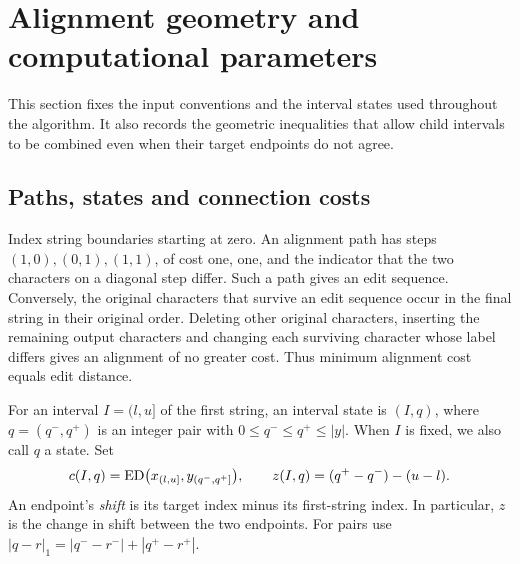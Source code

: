\section{Alignment geometry and computational parameters}\label{sec:geometry}
This section fixes the input conventions and the interval states used
throughout the algorithm. It also records the geometric inequalities that
allow child intervals to be combined even when their target endpoints do
not agree.

\subsection{Paths, states and connection costs}
Index string boundaries starting at zero. An alignment path has steps
$(1,0),(0,1),(1,1)$, of cost one, one, and the indicator that the two
characters on a diagonal step differ. Such a path gives an edit sequence.
Conversely, the original characters that survive an edit sequence occur in
the final string in their original order. Deleting other original
characters, inserting the remaining output characters and changing each
surviving character whose label differs gives an alignment of no greater
cost. Thus minimum alignment cost equals edit distance.

For an interval $I=(l,u]$ of the first string, an interval state is
$(I,q)$, where $q=(q^-,q^+)$ is an integer pair with
$0\le q^-\le q^+\le |y|$. When $I$ is fixed, we also call $q$ a state. Set
\[
 c(I,q)=\operatorname{ED}\bigl(x_{(l,u]},y_{(q^-,q^+]}\bigr),\qquad
 z(I,q)=(q^+-q^-)-(u-l).
\]
An endpoint's \emph{shift} is its target index minus its first-string index.
In particular, $z$ is the change in shift between the two endpoints.
For pairs use $|q-r|_1=|q^--r^-|+|q^+-r^+|$.


